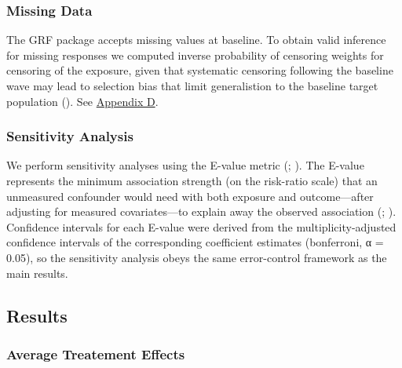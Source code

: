 \documentclass[
  single column]{article}
\begin{document}
\subsubsection{Missing Data}\label{missing-data}

The GRF package accepts missing values at baseline. To obtain valid
inference for missing responses we computed inverse probability of
censoring weights for censoring of the exposure, given that systematic
censoring following the baseline wave may lead to selection bias that
limit generalistion to the baseline target population
(). See
\hyperref[appendix-explain-grf]{Appendix D}.

\subsubsection{Sensitivity Analysis}\label{sensitivity-analysis}

We perform sensitivity analyses using the E-value metric
(;
). The E-value
represents the minimum association strength (on the risk-ratio scale)
that an unmeasured confounder would need with both exposure and
outcome---after adjusting for measured covariates---to explain away the
observed association (; ).
Confidence intervals for each E-value were derived from the
multiplicity-adjusted confidence intervals of the corresponding
coefficient estimates (bonferroni, α = 0.05), so the sensitivity
analysis obeys the same error-control framework as the main results.

\newpage{}

\subsection{Results}\label{results}

\subsubsection{Average Treatement
Effects}\label{average-treatement-effects}
\end{document}
